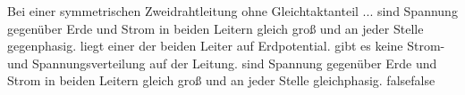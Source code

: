     {Bei einer symmetrischen Zweidrahtleitung ohne Gleichtaktanteil ...}
    {sind Spannung gegenüber Erde und Strom in beiden Leitern gleich groß und an jeder Stelle gegenphasig.}
    {liegt einer der beiden Leiter auf Erdpotential.}
    {gibt es keine Strom- und Spannungsverteilung auf der Leitung.}
    {sind Spannung gegenüber Erde und Strom in beiden Leitern gleich groß und an jeder Stelle gleichphasig.}
    {false}{false}